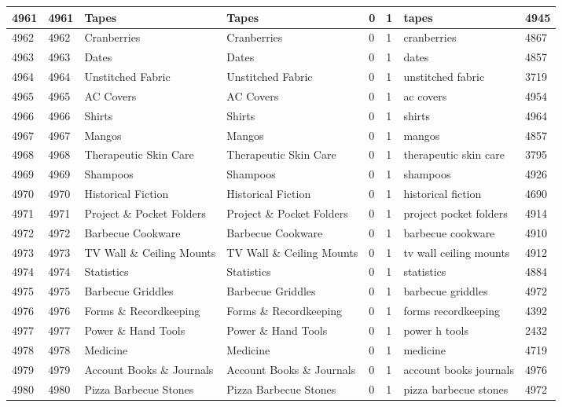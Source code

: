 \begin{longtable}{|l|l|l|l|l|l|l|l|}
4961 & 4961 & Tapes & Tapes & 0 & 1 & tapes & 4945 \\ \hline 
4962 & 4962 & Cranberries & Cranberries & 0 & 1 & cranberries & 4867 \\ \hline 
4963 & 4963 & Dates & Dates & 0 & 1 & dates & 4857 \\ \hline 
4964 & 4964 & Unstitched Fabric & Unstitched Fabric & 0 & 1 & unstitched fabric & 3719 \\ \hline 
4965 & 4965 & AC Covers & AC Covers & 0 & 1 & ac covers & 4954 \\ \hline 
4966 & 4966 & Shirts & Shirts & 0 & 1 & shirts & 4964 \\ \hline 
4967 & 4967 & Mangos & Mangos & 0 & 1 & mangos & 4857 \\ \hline 
4968 & 4968 & Therapeutic Skin Care & Therapeutic Skin Care & 0 & 1 & therapeutic skin care & 3795 \\ \hline 
4969 & 4969 & Shampoos & Shampoos & 0 & 1 & shampoos & 4926 \\ \hline 
4970 & 4970 & Historical Fiction & Historical Fiction & 0 & 1 & historical fiction & 4690 \\ \hline 
4971 & 4971 & Project \& Pocket Folders & Project \& Pocket Folders & 0 & 1 & project pocket folders & 4914 \\ \hline 
4972 & 4972 & Barbecue Cookware & Barbecue Cookware & 0 & 1 & barbecue cookware & 4910 \\ \hline 
4973 & 4973 & TV Wall \& Ceiling Mounts & TV Wall \& Ceiling Mounts & 0 & 1 & tv wall ceiling mounts & 4912 \\ \hline 
4974 & 4974 & Statistics & Statistics & 0 & 1 & statistics & 4884 \\ \hline 
4975 & 4975 & Barbecue Griddles & Barbecue Griddles & 0 & 1 & barbecue griddles & 4972 \\ \hline 
4976 & 4976 & Forms \& Recordkeeping & Forms \& Recordkeeping & 0 & 1 & forms recordkeeping & 4392 \\ \hline 
4977 & 4977 & Power \& Hand Tools & Power \& Hand Tools & 0 & 1 & power h tools & 2432 \\ \hline 
4978 & 4978 & Medicine & Medicine & 0 & 1 & medicine & 4719 \\ \hline 
4979 & 4979 & Account Books \& Journals & Account Books \& Journals & 0 & 1 & account books journals & 4976 \\ \hline 
4980 & 4980 & Pizza Barbecue Stones & Pizza Barbecue Stones & 0 & 1 & pizza barbecue stones & 4972 \\ \hline 

\end{longtable}
